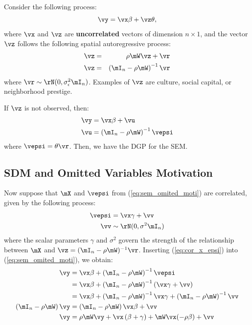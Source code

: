 \documentclass[english,12pt]{book}\usepackage[]{graphicx}\usepackage[]{xcolor}
\begin{document}
Consider the following process:
\begin{equation*}
\vy = \vx\beta + \vz\theta,
\end{equation*}
%
where $\vx$ and $\vz$ are \textbf{uncorrelated} vectors of dimension $n\times 1$, and the vector $\vz$ follows the following spatial autoregressive process:
\begin{eqnarray*}
  \vz &=& \rho \mW\vz + \vr \\
  \vz &=& \left(\mI_n - \rho\mW\right)^{-1}\vr
\end{eqnarray*}
%
where $\vr \sim \rN(0, \sigma^2_{\epsilon}\mI_n)$. Examples of $\vz$ are culture, social capital, or neighborhood prestige. 

If $\vz$ is not observed, then:
\begin{equation}\label{eq:sem_omited_moti}
  \begin{aligned}
    \vy & = \vx\beta + \vu \\
    \vu & = \left(\mI_n - \rho\mW\right)^{-1}\vepsi
  \end{aligned}
\end{equation}
%
where $\vepsi = \theta\vr$. Then, we have the DGP for the SEM.

\subsection{SDM and Omitted Variables Motivation}

Now suppose that $\mX$ and $\vepsi$ from (\ref{eq:sem_omited_moti}) are correlated, given by the following process:
\begin{equation}\label{eq:cor_x_epsi}
\begin{aligned}
  \vepsi & = \vx \gamma + \vv \\
  \vv    & \sim \rN(0, \sigma^2\mI_n) 
\end{aligned}
\end{equation}
%
where the scalar parameters $\gamma$ and $\sigma^2$ govern the strength of the relationship between $\mX$ and $\vz = (\mI_n-\rho\mW)^{-1}\vr$. Inserting (\ref{eq:cor_x_epsi}) into (\ref{eq:sem_omited_moti}), we obtain:
\begin{equation}
  \begin{aligned}
    \vy & = \vx\beta + \left(\mI_n - \rho\mW\right)^{-1}\vepsi \\
        & = \vx\beta + \left(\mI_n - \rho\mW\right)^{-1}\left(\vx \gamma + \vv\right) \\
        & = \vx\beta + \left(\mI_n - \rho\mW\right)^{-1}\vx \gamma + \left(\mI_n - \rho\mW\right)^{-1}\vv \\
       \left(\mI_n - \rho\mW\right)\vy & = \left(\mI_n - \rho\mW\right)\vx\beta  + \vv \\
       \vy & = \rho\mW\vy + \vx\left(\beta + \gamma\right) + \mW\vx(-\rho\beta) + \vv
  \end{aligned}
\end{equation}
\end{document}
